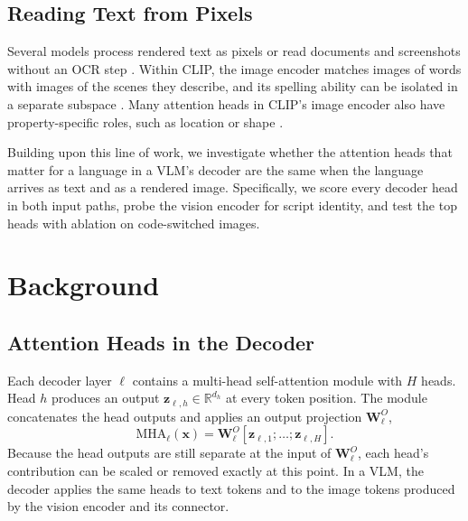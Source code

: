 \documentclass[10pt]{article}
\begin{document}
\subsection{Reading Text from Pixels}

Several models process rendered text as pixels \citep{rust2023pixel, tschannen2023clippo} or read documents and screenshots without an OCR step \citep{kim2022donut, lee2023pix2struct}. Within CLIP, the image encoder matches images of words with images of the scenes they describe, and its spelling ability can be isolated in a separate subspace \citep{materzynska2022disentangling}. Many attention heads in CLIP's image encoder also have property-specific roles, such as location or shape \citep{gandelsman2024interpreting}.

Building upon this line of work, we investigate whether the attention heads that matter for a language in a VLM's decoder are the same when the language arrives as text and as a rendered image. Specifically, we score every decoder head in both input paths, probe the vision encoder for script identity, and test the top heads with ablation on code-switched images.

\section{Background}
\label{sec:background}

\subsection{Attention Heads in the Decoder}

Each decoder layer $\ell$ contains a multi-head self-attention module with $H$ heads. Head $h$ produces an output $\mathbf{z}_{\ell,h} \in \mathbb{R}^{d_h}$ at every token position. The module concatenates the head outputs and applies an output projection $\mathbf{W}^{O}_{\ell}$,
\begin{equation}
    \mathrm{MHA}_{\ell}(\mathbf{x}) = \mathbf{W}^{O}_{\ell} \left[ \mathbf{z}_{\ell,1}; \dots; \mathbf{z}_{\ell,H} \right].
\end{equation}
Because the head outputs are still separate at the input of $\mathbf{W}^{O}_{\ell}$, each head's contribution can be scaled or removed exactly at this point. In a VLM, the decoder applies the same heads to text tokens and to the image tokens produced by the vision encoder and its connector.
\end{document}
